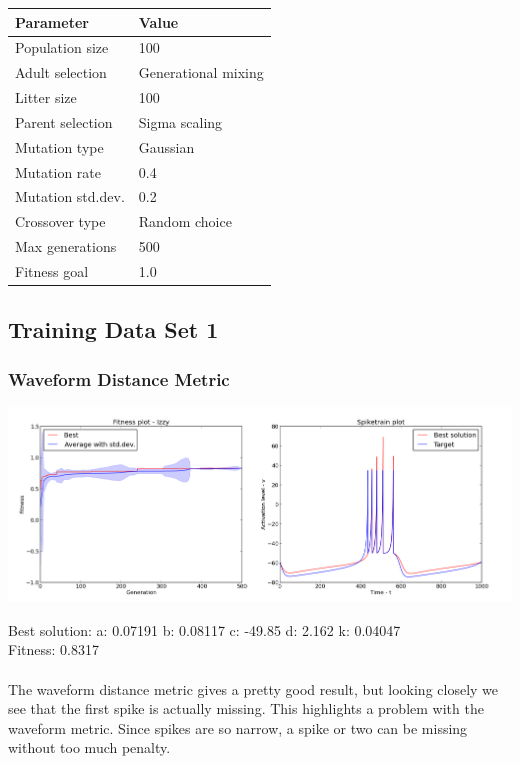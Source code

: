 \documentclass[a4paper,12pt]{article}
\begin{document}
\begin{tabular}{ll}
\hline
Parameter & Value \\
\hline \hline
Population size & 100 \\
Adult selection & Generational mixing \\
Litter size & 100 \\
Parent selection & Sigma scaling \\
Mutation type & Gaussian \\
Mutation rate & 0.4 \\
Mutation std.dev. & 0.2 \\
Crossover type & Random choice \\
Max generations & 500 \\
Fitness goal & 1.0 \\
\hline
\end{tabular}
\subsection{Training Data Set 1}
\subsubsection{Waveform Distance Metric}
\centerline{\includegraphics[width=1.0\textwidth]{img/case1_wave}}
Best solution: 
a: 0.07191 
b: 0.08117 
c: -49.85 
d: 2.162 
k: 0.04047 \\
Fitness: 0.8317
\paragraph{}The waveform distance metric gives a pretty good result, but looking closely we see that the first spike is actually missing. This highlights a problem with the waveform metric. Since spikes are so narrow, a spike or two can be missing without too much penalty.
\end{document}
